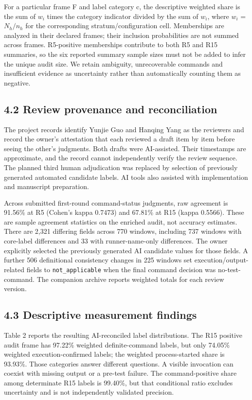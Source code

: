 \documentclass[10pt,a4paper]{article}
\begin{document}
For a particular frame F and label category c, the descriptive weighted share is the sum of $w_i$ times the category indicator divided by the sum of $w_i$, where $w_i$ = $N_h/n_h$ for the corresponding stratum/configuration cell. Memberships are analyzed in their declared frames; their inclusion probabilities are not summed across frames. R5-positive memberships contribute to both R5 and R15 summaries, so the six reported summary sample sizes must not be added to infer the unique audit size. We retain ambiguity, unrecoverable commands and insufficient evidence as uncertainty rather than automatically counting them as negative.

\subsection{4.2 Review provenance and reconciliation}
The project records identify Yunjie Guo and Hanqing Yang as the reviewers and record the owner's attestation that each reviewed a draft item by item before seeing the other's judgments. Both drafts were AI-assisted. Their timestamps are approximate, and the record cannot independently verify the review sequence. The planned third human adjudication was replaced by selection of previously generated automated candidate labels. AI tools also assisted with implementation and manuscript preparation.

Across submitted first-round command-status judgments, raw agreement is 91.56\% at R5 (Cohen's kappa 0.7473) and 67.81\% at R15 (kappa 0.5566). These are sample agreement statistics on the enriched audit, not accuracy estimates. There are 2,321 differing fields across 770 windows, including 737 windows with core-label differences and 33 with runner-name-only differences. The owner explicitly selected the previously generated AI candidate values for those fields. A further 506 definitional consistency changes in 225 windows set execution/output-related fields to \texttt{not\_applicable} when the final command decision was no-test-command. The companion archive reports weighted totals for each review version.

\subsection{4.3 Descriptive measurement findings}
Table 2 reports the resulting AI-reconciled label distributions. The R15 positive audit frame has 97.22\% weighted definite-command labels, but only 74.05\% weighted execution-confirmed labels; the weighted process-started share is 93.93\%. Those categories answer different questions. A visible invocation can coexist with missing output or a pre-test failure. The command-positive share among determinate R15 labels is 99.40\%, but that conditional ratio excludes uncertainty and is not independently validated precision.
\end{document}

